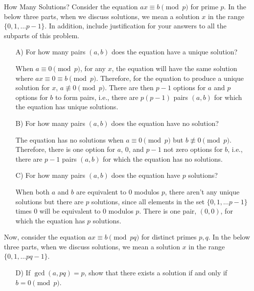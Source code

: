 \begin{homeworkProblem}{How Many Solutions?}
    Consider the equation $ax \equiv b \pmod p$ for prime $p$. In the below three
    parts, when we discuss solutions, we mean a solution $x$ in the range $\{0, 
    1, \dots p-1\}$. In addition, include justification for your answers to all
    the subparts of this problem.

    \begin{itemize}
        \item[A)] For how many pairs $(a,b)$ does the equation have a unique solution?
        
        When $a \equiv 0 \pmod{p}$, for any $x$, the equation will have the same
        solution where $ax \equiv 0 \equiv b \pmod{p}$. Therefore, for the equation
        to produce a unique solution for $x$, $a \not\equiv 0 \pmod{p}$. There are 
        then $p-1$ options for $a$ and $p$ options for $b$ to form pairs, i.e.,
        there are $p(p-1)$ pairs $(a,b)$ for which the equation has unique solutions.
        
        \item[B)] For how many pairs $(a,b)$ does the equation have no solution?
        
        The equation has no solutions when $a \equiv 0 \pmod{p}$ but $b \not\equiv
        0 \pmod{p}$. Therefore, there is one option for $a$, 0, and $p-1$ not zero
        options for $b$, i.e., there are $p-1$ pairs $(a, b)$ for which the equation
        has no solutions. 

        \item[C)] For how many pairs $(a,b)$ does the equation have $p$ solutions?
        
        When both $a$ and $b$ are equivalent to 0 modulos $p$, there aren't any 
        unique solutions but there are $p$ solutions, since all elements in the 
        set $\{0, 1, \dots p-1\}$ times 0 will be equivalent to 0 modulos $p$.
        There is one pair, $(0, 0)$, for which the equation has $p$ solutions. 

    \end{itemize}

    Now, consider the equation $ax \equiv b \pmod{pq}$ for distinct primes $p,q$.
    In the below three parts, when we discuss solutions, we mean a solution $x$ 
    in the range $\{0, 1, \dots pq-1\}$.

    \begin{itemize}
        \item[D)] If $\gcd(a, pq) = p$, show that there exists a solution if and 
        only if $b = 0 \pmod p$. 


\end{itemize}
\end{homeworkProblem}
